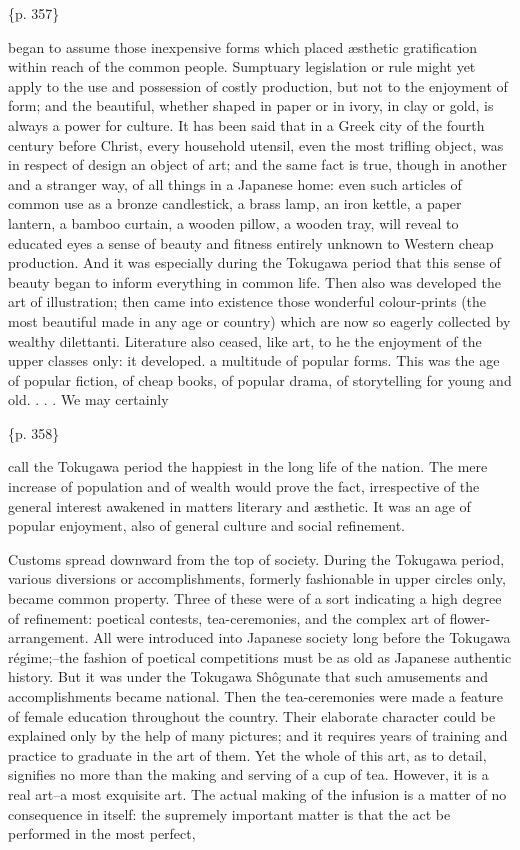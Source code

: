 \{p. 357\}

began to assume those inexpensive forms which placed æsthetic gratification within reach of the common people. Sumptuary legislation or rule might yet apply to the use and possession of costly production, but not to the enjoyment of form; and the beautiful, whether shaped in paper or in ivory, in clay or gold, is always a power for culture. It has been said that in a Greek city of the fourth century before Christ, every household utensil, even the most trifling object, was in respect of design an object of art; and the same fact is true, though in another and a stranger way, of all things in a Japanese home: even such articles of common use as a bronze candlestick, a brass lamp, an iron kettle, a paper lantern, a bamboo curtain, a wooden pillow, a wooden tray, will reveal to educated eyes a sense of beauty and fitness entirely unknown to Western cheap production. And it was especially during the Tokugawa period that this sense of beauty began to inform everything in common life. Then also was developed the art of illustration; then came into existence those wonderful colour-prints (the most beautiful made in any age or country) which are now so eagerly collected by wealthy dilettanti. Literature also ceased, like art, to he the enjoyment of the upper classes only: it developed. a multitude of popular forms. This was the age of popular fiction, of cheap books, of popular drama, of storytelling for young and old. . . . We may certainly

\{p. 358\}

call the Tokugawa period the happiest in the long life of the nation. The mere increase of population and of wealth would prove the fact, irrespective of the general interest awakened in matters literary and æsthetic. It was an age of popular enjoyment, also of general culture and social refinement.

Customs spread downward from the top of society. During the Tokugawa period, various diversions or accomplishments, formerly fashionable in upper circles only, became common property. Three of these were of a sort indicating a high degree of refinement: poetical contests, tea-ceremonies, and the complex art of flower-arrangement. All were introduced into Japanese society long before the Tokugawa régime;--the fashion of poetical competitions must be as old as Japanese authentic history. But it was under the Tokugawa Shôgunate that such amusements and accomplishments became national. Then the tea-ceremonies were made a feature of female education throughout the country. Their elaborate character could be explained only by the help of many pictures; and it requires years of training and practice to graduate in the art of them. Yet the whole of this art, as to detail, signifies no more than the making and serving of a cup of tea. However, it is a real art--a most exquisite art. The actual making of the infusion is a matter of no consequence in itself: the supremely important matter is that the act be performed in the most perfect,

